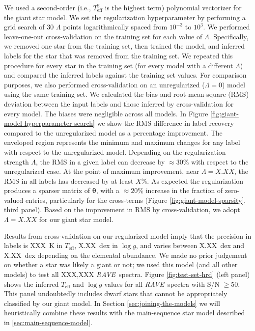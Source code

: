 \documentclass[preprint,trackchanges]{aastex}
\newcommand{\acronym}[1]{{\small{#1}}}
\newcommand{\project}[1]{\textsl{#1}}
\newcommand{\rave}{\project{\acronym{RAVE}}}
\newcommand{\teff}{T_{\mathrm{eff}}}
\newcommand{\logg}{\log g}
\newcommand{\Dvector}[1]{\boldsymbol{#1}}
\newcommand{\vectheta}{\Dvector{\theta}}
\begin{document}
We used a second-order (i.e., $\teff^2$ is the highest term) polynomial 
vectorizer for the giant star model.  We set the regularization hyperparameter
by performing a grid search of 30 $\Lambda$ points logarithmically spaced from 
$10^{-3}$ to $10^{3}$.  We performed leave-one-out cross-validation on the
training set for each value of $\Lambda$.  Specifically, we removed one star
from the training set, then trained the model, and inferred labels for the 
star that was removed from the training set.  We repeated this procedure for
every star in the training set (for every model with a different $\Lambda$)
and compared the inferred labels against the training set values.  For
comparison purposes, we also performed cross-validation on an unregularized 
($\Lambda = 0$) model using the same training set.  We calculated the bias
and root-mean-square (RMS) deviation between the input labels and those inferred
by cross-validation for every model.  The biases were negligible across all
models.  In Figure \ref{fig:giant-model-hyperparameter-search} we show the
RMS difference in label recovery compared to the unregularized model as a 
percentage improvement.  The enveloped region represents the minimum and 
maximum changes for any label with respect to the unregularized model.
Depending on the regularization strength $\Lambda$, the RMS in a given label
can decrease by $\approx30$\% with respect to the unregularized case.  At the
point of maximum improvement, near $\Lambda = X.XX$, the RMS in all labels has
decreased by at least $X$\%.  As expected the regularization produces a 
sparser matrix of $\vectheta$, with a $\approx20$\% increase in the fraction
of zero-valued entries, particularly for the cross-terms (Figure 
\ref{fig:giant-model-sparsity}, third panel).  Based on the improvement in 
RMS by cross-validation, we adopt $\Lambda = X.XX$ for our giant star model.


Results from cross-validation on our regularized model imply that the precision
in labels is XXX~K in $\teff$, X.XX~dex in $\logg$, and varies between X.XX~dex
and X.XX~dex depending on the elemental abundance.  We made no prior judgement
on whether a star was likely a giant or not; we used this model (and all other
models) to test all XXX,XXX \rave\ spectra.  Figure \ref{fig:test-set-hrd} (left
panel) shows the inferred $\teff$ and $\logg$ values for all \rave\ spectra with
S/N $\geqslant 50$.  This panel undoubtedly includes dwarf stars that cannot be
appropriately classified by our giant model.  In Section \ref{sec:joining-the-models}
we will heuristically combine these results with the main-sequence star model
described in \ref{sec:main-sequence-model}.
\end{document}
